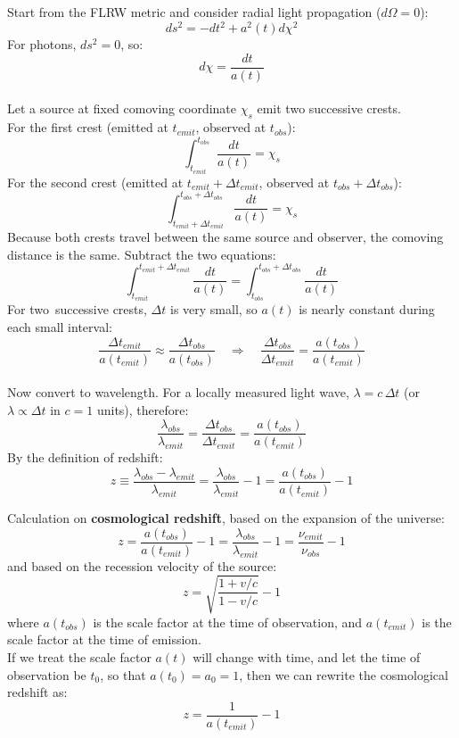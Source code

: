 \bigskip\noindent
\begin{foundation}
    Start from the FLRW metric and consider radial light propagation ($d\Omega = 0$):
    \[
        ds^2 = -dt^2 + a^2(t) d\chi^2
    \]
    For photons, $ds^2 = 0$, so:
    \[
        d\chi = \frac{dt}{a(t)}
    \] \\

    Let a source at fixed comoving coordinate $\chi_s$ emit two successive crests. \\
    For the first crest (emitted at $t_{emit}$, observed at $t_{obs}$):
    \[
        \int_{t_{emit}}^{t_{obs}} \frac{dt}{a(t)} = \chi_s
    \]
    For the second crest (emitted at $t_{emit}+\Delta t_{emit}$, observed at $t_{obs}+\Delta t_{obs}$):
    \[
        \int_{t_{emit}+\Delta t_{emit}}^{t_{obs}+\Delta t_{obs}} \frac{dt}{a(t)} = \chi_s
    \]
    Because both crests travel between the same source and observer, the comoving distance is the same. Subtract the two equations:
    \[
        \int_{t_{emit}}^{t_{emit}+\Delta t_{emit}} \frac{dt}{a(t)}
        =
        \int_{t_{obs}}^{t_{obs}+\Delta t_{obs}} \frac{dt}{a(t)}
    \]
    For two \,successive crests, $\Delta t$ is very small, so $a(t)$ is nearly constant during each small interval:
    \[
        \frac{\Delta t_{emit}}{a(t_{emit})} \approx \frac{\Delta t_{obs}}{a(t_{obs})}
        \quad \Rightarrow \quad
        \frac{\Delta t_{obs}}{\Delta t_{emit}} = \frac{a(t_{obs})}{a(t_{emit})}
    \] \\

    Now convert to wavelength. For a locally measured light wave, $\lambda = c\,\Delta t$ (or $\lambda \propto \Delta t$ in $c=1$ units), therefore:
    \[
        \frac{\lambda_{obs}}{\lambda_{emit}} = \frac{\Delta t_{obs}}{\Delta t_{emit}} = \frac{a(t_{obs})}{a(t_{emit})}
    \]
    By the definition of redshift:
    \[
        z \equiv \frac{\lambda_{obs}-\lambda_{emit}}{\lambda_{emit}}
        = \frac{\lambda_{obs}}{\lambda_{emit}} - 1
        = \frac{a(t_{obs})}{a(t_{emit})} - 1
    \]
\end{foundation}


\bigskip\noindent
\begin{theory}
    Calculation on \textbf{cosmological redshift}, based on the expansion of the universe:
    \[
        z = \frac{a(t_{obs})}{a(t_{emit})} - 1 = \frac{\lambda_{obs}}{\lambda_{emit}} - 1 = \frac{\nu_{emit}}{\nu_{obs}} - 1
    \]
    and based on the recession velocity of the source:
    \[
        z = \sqrt{\frac{1 + v/c}{1 - v/c}} - 1
    \]
    where $a(t_{obs})$ is the scale factor at the time of observation, and $a(t_{emit})$ is the scale factor at the time of emission. \\

    If we treat the scale factor $a(t)$ will change with time, and let the time of observation be $t_0$, so that $a(t_0) = a_0 = 1$, then we can rewrite the cosmological redshift as:
    \[
        z = \frac{1}{a(t_{emit})} - 1
    \]
\end{theory}

